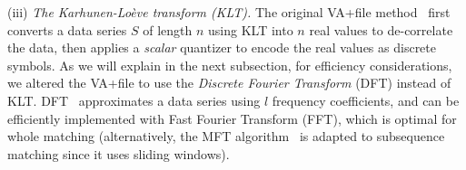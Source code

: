 \noindent(iii) \textit{The Karhunen-Lo\`{e}ve transform (KLT).} 
The original VA+file method~\cite{conf/cikm/Hakan2000} first converts a data series $S$ of length $n$ using KLT into $n$ real values to de-correlate the data, then applies a \emph{scalar} quantizer to encode the real values as discrete symbols.
As {\color{black}we} will explain in the next subsection, for efficiency considerations, we altered the VA+file to use the {\it Discrete Fourier Transform} (DFT) instead of KLT. DFT~\cite{conf/fodo/Agrawal1993,conf/sigmod/Faloutsos1994,conf/sigmod/Rafiei1997,journal/corr/Rafiei1998} 
approximates a data series using $l$ frequency coefficients, 
and can be efficiently implemented with Fast Fourier Transform (FFT), which is 
optimal for whole matching (alternatively, the MFT algorithm~\cite{conf/icdsp/Albrecht1997} is adapted to subsequence matching %
since it uses sliding windows).


\begin{comment}
\begin{figure}[tb]
	\captionsetup{justification=centering}
	\texttt{[image: \{summarizations]}}
	\caption{Summarizations}
	\label{fig:summarizations}
\end{figure}
\end{comment}

